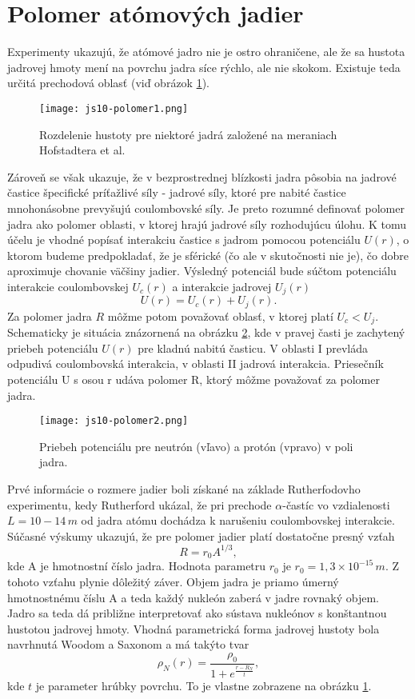 \documentclass[../../main.tex]{subfiles}
\begin{document}
\section{Polomer atómových jadier}
Experimenty ukazujú, že atómové jadro nie je ostro ohraničene, ale že sa hustota jadrovej hmoty mení na povrchu jadra síce rýchlo, ale nie skokom. Existuje teda určitá prechodová oblasť (viď obrázok \ref{js10:polomer1}).
\begin{figure}[h]
 \centerline{\texttt{[image: js10-polomer1.png]}}
 \caption{Rozdelenie hustoty pre niektoré jadrá založené na meraniach Hofstadtera et al.}
 \label{js10:polomer1}
\end{figure}
\newline
Zároveň se však ukazuje, že v bezprostrednej blízkosti jadra pôsobia na jadrové častice špecifické príťažlivé síly - jadrové síly, ktoré pre nabité častice mnohonásobne prevyšujú coulombovské síly. Je preto rozumné definovať polomer jadra ako polomer oblasti, v ktorej hrajú jadrové síly rozhodujúcu úlohu. K tomu účelu je vhodné popísať interakciu častice s jadrom pomocou potenciálu $U(r)$, o ktorom budeme predpokladať, že je sférické (čo ale v skutočnosti nie je), čo dobre aproximuje chovanie väčšiny jadier. Výsledný potenciál bude súčtom potenciálu interakcie coulombovskej $U_c(r)$ a interakcie jadrovej $U_j(r)$ 
\begin{equation} 
U(r)=U_c(r)+U_j(r).
\end{equation}
Za polomer jadra $R$ môžme potom považovať oblasť, v ktorej platí $U_c < U_j$. Schematicky je situácia znázornená na obrázku \ref{js10:polomer2}, kde v pravej časti je zachytený priebeh potenciálu $U(r)$ pre kladnú nabitú časticu. V oblasti I prevláda odpudivá coulombovská interakcia, v oblasti II jadrová interakcia. Priesečník potenciálu U s osou r udáva polomer R, ktorý môžme považovať za polomer jadra.
\begin{figure}[h]
 \centerline{\texttt{[image: js10-polomer2.png]}}
 \caption{Priebeh potenciálu pre neutrón (vľavo) a protón (vpravo) v poli jadra.}
 \label{js10:polomer2}
\end{figure}
\newline
Prvé informácie o rozmere jadier boli získané na základe Rutherfodovho experimentu, kedy Rutherford ukázal, že pri prechode $\alpha$-častíc vo vzdialenosti $L=10-14\,m$ od jadra atómu dochádza k narušeniu coulombovskej interakcie. Súčasné výskumy ukazujú, že pre polomer jadier platí dostatočne presný vzťah
$$ R=r_0A^{1/3},$$
kde A je hmotnostní číslo jadra. Hodnota parametru $r_0$ je $r_0=1,3\times10^{-15}\,m$. Z tohoto vzťahu plynie dôležitý záver. Objem jadra je priamo úmerný hmotnostnému číslu A a teda každý nukleón zaberá v jadre rovnaký objem. Jadro sa teda dá približne interpretovať ako sústava nukleónov s konštantnou hustotou jadrovej hmoty. Vhodná parametrická forma jadrovej hustoty bola navrhnutá Woodom a Saxonom a má takýto tvar
$$ \rho_N(r)=\frac{\rho_0}{1+e^{\frac{r-R_N}{t}}},$$
kde $t$ je parameter hrúbky povrchu. To je vlastne zobrazene na obrázku \ref{js10:polomer1}.
\end{document}
